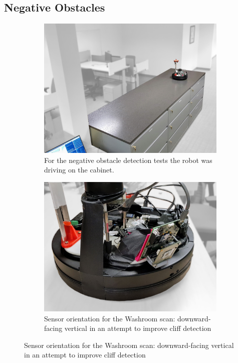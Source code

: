 \subsection{Negative Obstacles}\label{negative-obstacles}
\begin{figure}[htbp]
    \centering
    \begin{subfigure}[t]{.475\textwidth}
        \includegraphics[width=\textwidth]{gfx/pictures/cliff}
        \caption{For the negative obstacle detection tests the robot was driving on the cabinet.}
        \label{fig:cliff}
    \end{subfigure}%
    \hfill%
    \begin{subfigure}[t]{.475\textwidth}
        \includegraphics[width=\textwidth]{gfx/pictures/cliff_sensor}
        \caption{Sensor orientation for the Washroom scan: downward-facing vertical in an attempt to improve cliff detection}
        \label{fig:cliff_sensor}
    \end{subfigure}
\end{figure}

